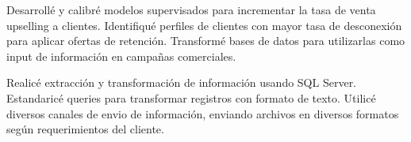\documentclass[10pt, a4paper, ragged2e, withhyper, spanish]{altacv}
\begin{document}
\begin{paracol}{2}

{\justify Desarrollé y calibré modelos supervisados para incrementar la tasa de venta upselling a clientes. Identifiqué perfiles de clientes con mayor tasa de desconexión para aplicar ofertas de retención. Transformé bases de datos para utilizarlas como input de información en campañas comerciales.}\\
{}

\divider
\smallskip
 

{\justify Realicé extracción y transformación de información usando SQL Server. 
 Estandaricé queries para transformar registros con formato de texto. 
 Utilicé diversos canales de envio de información, enviando archivos en diversos formatos según requerimientos del cliente.}\\  
{}

\bigskip
\medskip




\end{paracol}
\end{document}
